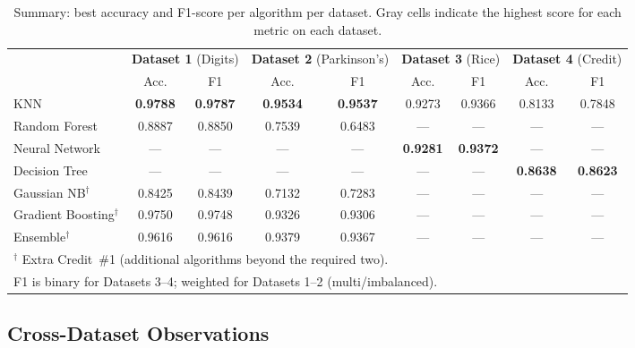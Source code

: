 \documentclass[11pt,letterpaper]{article}
\begin{document}
\begin{table}[ht]
\centering
\caption{Summary: best accuracy and F1-score per algorithm per dataset.
         Gray cells indicate the highest score for each metric on each dataset.}
\label{tab:summary}
\renewcommand{\arraystretch}{1.3}
\setlength{\tabcolsep}{5pt}
\begin{tabular}{lcccccccc}
\toprule
& \multicolumn{2}{c}{\textbf{Dataset 1} (Digits)}
& \multicolumn{2}{c}{\textbf{Dataset 2} (Parkinson's)}
& \multicolumn{2}{c}{\textbf{Dataset 3} (Rice)}
& \multicolumn{2}{c}{\textbf{Dataset 4} (Credit)} \\
\cmidrule(lr){2-3}\cmidrule(lr){4-5}\cmidrule(lr){6-7}\cmidrule(lr){8-9}
& Acc. & F1 & Acc. & F1 & Acc. & F1 & Acc. & F1 \\
\midrule
KNN
  & \cellcolor{hilight}\textbf{0.9788}
  & \cellcolor{hilight}\textbf{0.9787}
  & \cellcolor{hilight}\textbf{0.9534}
  & \cellcolor{hilight}\textbf{0.9537}
  & 0.9273 & 0.9366
  & 0.8133 & 0.7848 \\
Random Forest
  & 0.8887 & 0.8850
  & 0.7539 & 0.6483
  & --- & ---
  & --- & --- \\
Neural Network
  & --- & ---
  & --- & ---
  & \cellcolor{hilight}\textbf{0.9281}
  & \cellcolor{hilight}\textbf{0.9372}
  & --- & --- \\
Decision Tree
  & --- & ---
  & --- & ---
  & --- & ---
  & \cellcolor{hilight}\textbf{0.8638}
  & \cellcolor{hilight}\textbf{0.8623} \\
Gaussian NB$^\dagger$
  & 0.8425 & 0.8439
  & 0.7132 & 0.7283
  & --- & ---
  & --- & --- \\
Gradient Boosting$^\dagger$
  & 0.9750 & 0.9748
  & 0.9326 & 0.9306
  & --- & ---
  & --- & --- \\
Ensemble$^\dagger$
  & 0.9616 & 0.9616
  & 0.9379 & 0.9367
  & --- & ---
  & --- & --- \\
\bottomrule
\multicolumn{9}{l}{%
  $^\dagger$ Extra Credit~\#1 (additional algorithms beyond the required two).}\\
\multicolumn{9}{l}{%
  F1 is binary for Datasets 3--4; weighted for Datasets 1--2 (multi/imbalanced).}
\end{tabular}
\end{table}

\subsection{Cross-Dataset Observations}
\end{document}
